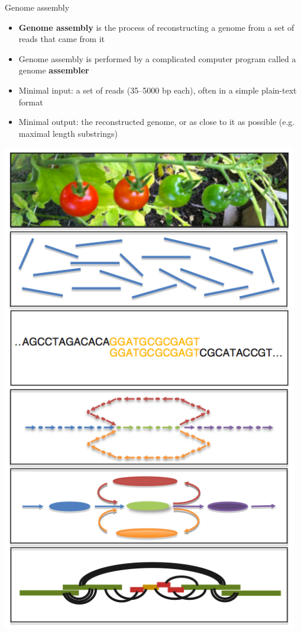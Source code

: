 \documentclass[xcolor=dvipsnames]{beamer}
\begin{document}
\begin{frame}{Genome assembly}
    \begin{minipage}{0.63\textwidth}
        \begin{itemize}
            \item {\bf Genome assembly} is the process of reconstructing
                  a genome from a set of reads that came from it
            \item Genome assembly is performed by a complicated computer program
                called a genome {\bf assembler}
            \item Minimal input: a set of reads (35--5000 bp each), often in a
                simple plain-text format
            \item Minimal output: the reconstructed genome, or as close to it as
                possible (e.g. maximal length substrings)
        \end{itemize}
    \end{minipage}
    \begin{minipage}{0.35\textwidth}
        \includegraphics[width=0.97\textwidth]{AssemblyFlow.jpg}
    \end{minipage}
\end{frame}
\end{document}
